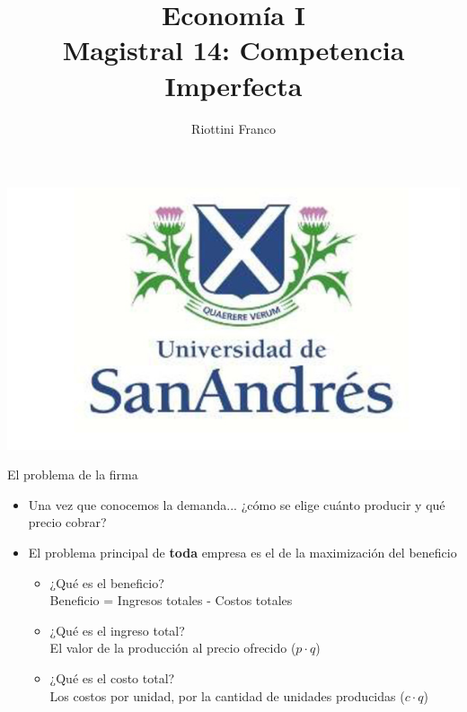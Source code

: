 \documentclass{beamer}
\title[Economía I]{Economía I \vspace{4mm}
\\ Magistral 14: Competencia Imperfecta}
\date{}
\author[Franco Riottini]{Riottini Franco}
\institute[]{Universidad de San Andrés}
\begin{document}
\begin{frame}
    \titlepage
    \centering
    \includegraphics[scale=0.2]{../Figures/logoUDESA.jpg} 
\end{frame}


\begin{frame}{El problema de la firma}
    \begin{itemize}
        \item Una vez que conocemos la demanda... ¿cómo se elige cuánto producir y qué precio cobrar?
        \vspace{1mm}
        \item El problema principal de \textbf{toda} empresa es el de la maximización del beneficio
        \vspace{1mm}     
        \begin{itemize}
            \item ¿Qué es el beneficio? \vspace{1mm} \\ 
            Beneficio = Ingresos totales - Costos totales
            \vspace{1mm}
            \item ¿Qué es el ingreso total? 
            \vspace{1mm} \\ 
            El valor de la producción al precio ofrecido ($p \cdot q$)
            \vspace{1mm}
            \item ¿Qué es el costo total?
            \vspace{1mm} \\ 
            Los costos por unidad, por la cantidad de unidades producidas ($c \cdot q$)
        \end{itemize} 
    \end{itemize} 
\end{frame}
\end{document}
